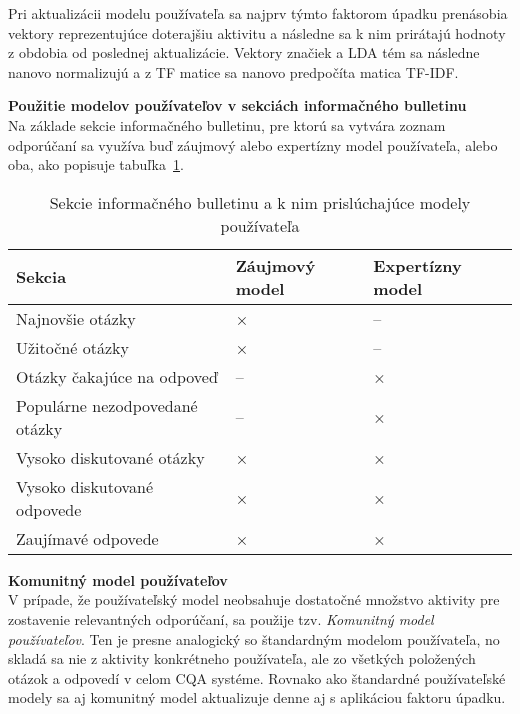 Pri aktualizácii modelu používateľa sa najprv týmto faktorom úpadku prenásobia vektory reprezentujúce doterajšiu aktivitu
a následne sa k nim prirátajú hodnoty z obdobia od poslednej aktualizácie. Vektory značiek a LDA tém sa následne nanovo
normalizujú a z TF matice sa nanovo predpočíta matica TF-IDF.

\textbf{Použitie modelov používateľov v sekciách informačného bulletinu}\\
Na základe sekcie informačného bulletinu, pre ktorú sa vytvára zoznam odporúčaní sa využíva buď záujmový alebo
expertízny model používateľa, alebo oba, ako popisuje tabuľka~\ref{tab:sections}.

\begin{table}[h]
\label{tab:sections}
\centering
\caption{Sekcie informačného bulletinu a k nim prislúchajúce modely používateľa}
\begin{tabular}{|m{7cm}|>{\centering\arraybackslash}m{2.5cm}|>{\centering\arraybackslash}m{2.6cm}|}
\hline
\textbf{Sekcia} & \textbf{Záujmový model} & \textbf{Expertízny model} \\\hline
Najnovšie otázky               & ×  & -- \\\hline
Užitočné otázky                & ×  & -- \\\hline
Otázky čakajúce na odpoveď     & -- & ×  \\\hline
Populárne nezodpovedané otázky & -- & ×  \\\hline
Vysoko diskutované otázky      & ×  & ×  \\\hline
Vysoko diskutované odpovede    & ×  & ×  \\\hline
Zaujímavé odpovede             & ×  & ×  \\\hline
\end{tabular}
\end{table}

\textbf{Komunitný model používateľov}\\
V prípade, že používateľský model neobsahuje dostatočné množstvo aktivity pre zostavenie relevantných odporúčaní,
sa použije tzv. \textit{Komunitný model používateľov}. Ten je presne analogický so štandardným modelom používateľa,
no skladá sa nie z aktivity konkrétneho používateľa, ale zo všetkých položených otázok a odpovedí v celom CQA systéme.
Rovnako ako štandardné používateľské modely sa aj komunitný model aktualizuje denne aj s aplikáciou faktoru úpadku.
